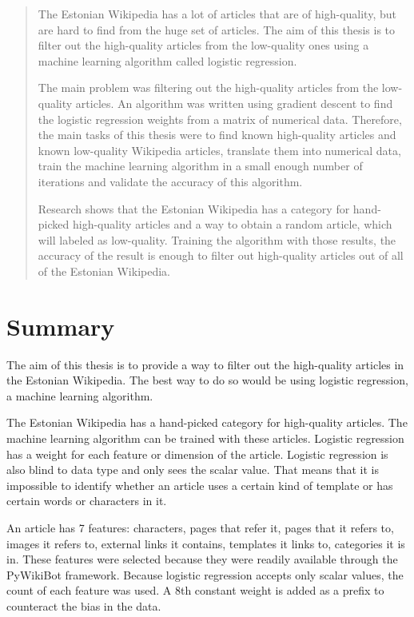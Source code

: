 \documentclass[a4paper, titlepage, 12pt]{article}
\newcommand{\bulletsection}[1]{\section*{#1}
\addcontentsline{toc}{section}{#1}}
\begin{document}


\begin{abstract}
The Estonian Wikipedia has a lot of articles that are of high-quality, but are
hard to find from the huge set of articles. The aim of this
thesis is to filter out the high-quality articles from the low-quality ones
using a machine learning algorithm called logistic regression.

The main problem was filtering out the high-quality articles from the
low-quality articles. An algorithm was written using gradient descent to find
the logistic regression weights from a matrix of numerical data. Therefore,
the main tasks of this thesis were to find known high-quality articles and known
low-quality Wikipedia articles, translate them into numerical data, train the
machine learning algorithm in a small enough number of iterations and validate
the accuracy of this algorithm.

Research shows that the Estonian Wikipedia has a category for hand-picked
high-quality articles and a way to obtain a random article, which will labeled
as low-quality. Training the algorithm with those results, the accuracy of the
result is enough to filter out high-quality articles out of all of the Estonian
Wikipedia.
\end{abstract}

\listoftables
\clearpage

\listoffigures
\clearpage

\tableofcontents
\clearpage






\bulletsection{Summary}
The aim of this thesis is to provide a way to filter out the high-quality
articles in the Estonian Wikipedia. The best way to do so would be using
logistic regression, a machine learning algorithm.

The Estonian Wikipedia has a hand-picked category for high-quality articles.
The machine learning algorithm can be trained with these articles. Logistic
regression has a weight for each feature or dimension of the article. Logistic
regression is also blind to data type and only sees the scalar value. That
means that it is impossible to identify whether an article uses a certain kind
of template or has certain words or characters in it.

An article has 7 features: characters, pages that refer it, pages that it refers
to, images it refers to, external links it contains, templates it links to,
categories it is in. These features were selected because they were readily
available through the PyWikiBot framework. Because logistic regression accepts
only scalar values, the count of each feature was used. A 8th constant weight is
added as a prefix to counteract the bias in the data.
\end{document}
